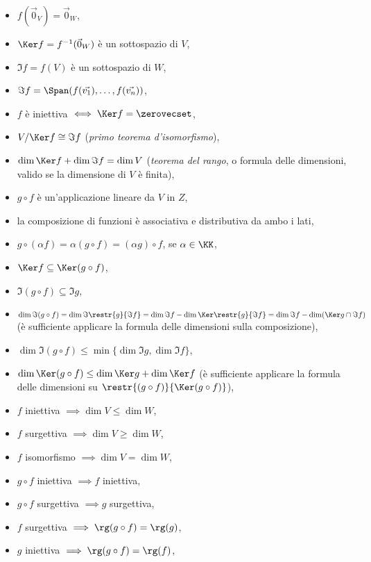 \documentclass[10pt,landscape]{article}
\begin{document}
\begin{multicols}{3}
		\begin{itemize}
			\item $f(\vec{0}_V) = \vec{0}_W$,
			\item $\Ker f = f^{-1}(\vec{0}_W)$ è un sottospazio di $V$,
			\item $\Im f = f(V)$ è un sottospazio di $W$,
			\item $\Im f = \Span(f(\vec{v_1}), \ldots, f(\vec{v_n}))$,
			\item $f$ è iniettiva $\iff \Ker f = \zerovecset$,
			\item $V/\Ker f \cong \Im f$ (\textit{primo teorema d'isomorfismo}),
			\item $\dim \Ker f + \dim \Im f = \dim V$ (\textit{teorema del rango}, o formula delle dimensioni,
			valido se la dimensione di $V$ è finita),
			\item $g \circ f$ è un'applicazione lineare da $V$ in $Z$,
			\item la composizione di funzioni è associativa e distributiva
			da ambo i lati,
			\item $g \circ (\alpha f) = \alpha (g \circ f) = (\alpha g) \circ f$,
			se $\alpha \in \KK$,
			\item $\Ker f \subseteq \Ker (g \circ f)$,
			\item $\Im (g \circ f) \subseteq \Im g$,
			\item $\dim \Im (g \circ f) = \dim \Im \restr{g}{\Im f} =
			\dim \Im f - \dim \Ker \restr{g}{\Im f} = \dim \Im f -
			\dim (\Ker g \cap \Im f)$ (è sufficiente applicare la formula             delle dimensioni sulla composizione),
			\item $\dim \Im (g \circ f) \leq \min\{\dim \Im g, \dim \Im f\}$,
			\item $\dim \Ker (g \circ f) \leq \dim \Ker g + \dim \Ker f$ (è
			sufficiente applicare la formula delle dimensioni su
			$\restr{(g \circ f)}{\Ker (g \circ f)}$),
			\item $f$ iniettiva $\implies \dim V \leq \dim W$,
			\item $f$ surgettiva $\implies \dim V \geq \dim W$,
			\item $f$ isomorfismo $\implies \dim V = \dim W$,
			\item $g \circ f$ iniettiva $\implies f$ iniettiva,
			\item $g \circ f$ surgettiva $\implies g$ surgettiva,
			\item $f$ surgettiva $\implies \rg(g \circ f) = \rg(g)$,
			\item $g$ iniettiva $\implies \rg(g \circ f) = \rg(f)$,

\end{itemize}
\end{multicols}
\end{document}
